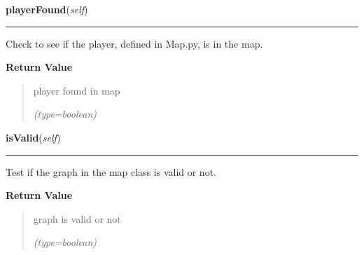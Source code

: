 \hspace{.8\funcindent}\begin{boxedminipage}{\funcwidth}

    \raggedright \textbf{playerFound}(\textit{self})

    \vspace{-1.5ex}

    \rule{\textwidth}{0.5\fboxrule}
\setlength{\parskip}{2ex}
    Check to see if the player, defined in Map.py, is in the map.

\setlength{\parskip}{1ex}
      \textbf{Return Value}
    \vspace{-1ex}

      \begin{quote}
      player found in map

      {\it (type=boolean)}

      \end{quote}

    \end{boxedminipage}

    \label{UnBlockMeSolver:Map:Map:Map:isValid}

    \vspace{0.5ex}

\hspace{.8\funcindent}\begin{boxedminipage}{\funcwidth}

    \raggedright \textbf{isValid}(\textit{self})

    \vspace{-1.5ex}

    \rule{\textwidth}{0.5\fboxrule}
\setlength{\parskip}{2ex}
    Test if the graph in the map class is valid or not.

\setlength{\parskip}{1ex}
      \textbf{Return Value}
    \vspace{-1ex}

      \begin{quote}
      graph is valid or not

      {\it (type=boolean)}

      \end{quote}

    \end{boxedminipage}

    \label{UnBlockMeSolver:Map:Map:Map:validAdditionMoves}

